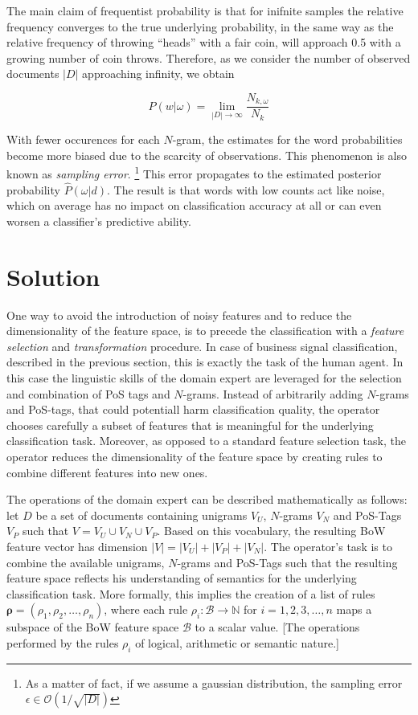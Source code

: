 The main claim of frequentist probability is that for inifnite samples the
relative frequency converges to the true underlying probability, in the same 
way as the relative frequency of throwing ``heads'' with a fair coin, will
approach 0.5 with a growing number of coin throws. Therefore, as we consider the
number of observed documents $|D|$ approaching infinity, we obtain 

\begin{equation}
	P(w|\omega) = \lim_{|D| \to \infty} \frac{N_{k,\omega}}{N_k}
\end{equation}

With fewer occurences for each $N$-gram, the estimates for the word probabilities
become more biased due to the scarcity of observations. This phenomenon is also
known as \emph{sampling error}. \footnote{As a matter of fact, if we assume a
gaussian distribution, the sampling error $\epsilon \in
\mathcal{O}(1/\sqrt{|D|})$} This error propagates to the estimated posterior probability $\hat{P}(\omega|d)$. 
The result is that words with low counts act like noise, which on average has no
impact on classification accuracy at all or can even worsen a classifier's
predictive ability.

\section{Solution}
One way to avoid the introduction of noisy features and to reduce the
dimensionality of the feature space, is to precede the classification with a
\emph{feature selection} and \emph{transformation} procedure. In case of
business signal classification, described in the previous section, this is
exactly the task of the human agent. In this case the linguistic skills of the 
domain expert are leveraged for the selection and combination of PoS tags
and $N$-grams. Instead of arbitrarily adding $N$-grams and PoS-tags, that
could potentiall harm classification quality, the operator chooses carefully a
subset of features that is meaningful for the underlying classification task. 
Moreover, as opposed to a standard feature selection task, the operator reduces
the dimensionality of the feature space by creating rules to combine different 
features into new ones.

The operations of the domain expert can be described mathematically as follows: 
let $D$ be a set of documents containing unigrams $V_U$, $N$-grams $V_N$ and
PoS-Tags $V_P$ such that $V = V_U \cup V_N \cup V_P$. Based on this vocabulary, the resulting BoW
feature vector has dimension $|V| = |V_U| + |V_P| + |V_N|$.
The operator's task is to combine the available unigrams, $N$-grams and PoS-Tags
such that the resulting feature space reflects his understanding
of semantics for the underlying classification task.
More formally, this implies the creation of a list of rules
$\boldsymbol{\rho} = (\rho_1, \rho_2, \ldots, \rho_n)$, where each rule $\rho_i:
\mathcal{B} \to \mathbb{N}$ for $i=1,2,3,\ldots,n$ maps a subspace of the BoW
feature space $\mathcal{B}$ to a scalar value.
[The operations performed by the rules $\rho_i$ of logical, arithmetic or
semantic nature.]

